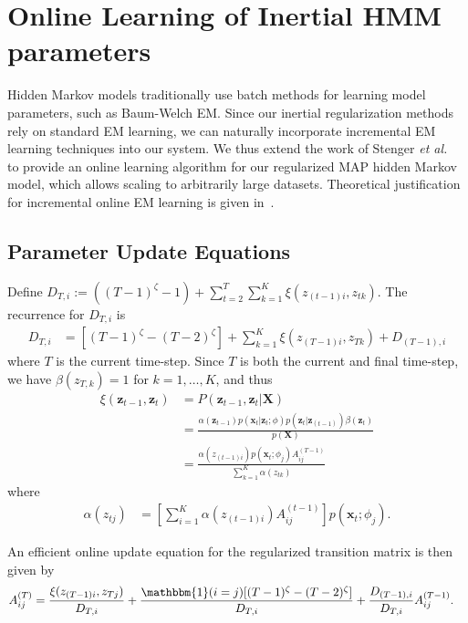 \documentclass[12pt]{article}
\begin{document}
\section{Online Learning of Inertial HMM parameters}

Hidden Markov models traditionally use batch methods for learning model parameters, such as Baum-Welch EM. Since our inertial regularization methods rely on standard EM learning, we can naturally incorporate incremental EM learning techniques into our system. We thus extend the work of Stenger \emph{et al.}~\cite{stenger2001} to provide an online learning algorithm for our regularized MAP hidden Markov model, which allows scaling to arbitrarily large datasets. Theoretical justification for incremental online EM learning is given in~\cite{Neal:1999:VEA:308574.308679}.

\subsection{Parameter Update Equations}

Define $D_{T,i} := ((T-1)^\zeta -1) + \sum_{t=2}^{T}\sum_{k=1}^{K} \xi(z_{(t-1)i}, z_{tk})$. The recurrence for $D_{T,i}$ is
\begin{align*}
    D_{T,i} &= [(T-1)^\zeta - (T-2)^\zeta] +  \sum_{k=1}^{K} \xi(z_{(T-1)i}, z_{Tk}) + D_{(T-1), i}
\end{align*}
where $T$ is the current time-step. Since $T$ is both the current and final time-step, we have $\beta(z_{T,k}) = 1$ for $k = 1, \ldots, K$, and thus
\begin{align*}
    \xi(\mathbf{z}_{t-1}, \mathbf{z}_{t}) 
            &= P(\mathbf{z}_{t-1}, \mathbf{z}_{t} | \mathbf{X}) \\
            &= \frac{\alpha(\mathbf{z}_{t-1})p(\mathbf{x}_t|\mathbf{z}_t; \phi)p(\mathbf{z}_{t}|\mathbf{z}_{(t-1)})\beta(\mathbf{z}_t)}{p(\mathbf{X})} \\
            &= \frac{\alpha(z_{(t-1)i})p(\mathbf{x}_t; \phi_j)A_{ij}^{(T-1)}}{\sum_{k=1}^{K}\alpha(z_{tk})}
\end{align*}
where
\begin{align*}
    \alpha(z_{tj}) &= \left[\sum_{i=1}^{K} \alpha(z_{(t-1)i})A_{ij}^{(t-1)}\right]p(\mathbf{x}_t; \phi_j).
\end{align*}

An efficient online update equation for the regularized transition matrix is then given by
\begin{align*}
    A_{ij}^{(T)} &= \frac{\xi(z_{(T-1)i}, z_{Tj})}{D_{T,i}} + \frac{\mathbbm{1}(i = j)[(T-1)^\zeta - (T-2)^\zeta]}{D_{T,i}} + \frac{D_{(T-1), i}}{D_{T,i}}A_{ij}^{(T-1)}.
\end{align*}
\end{document}

